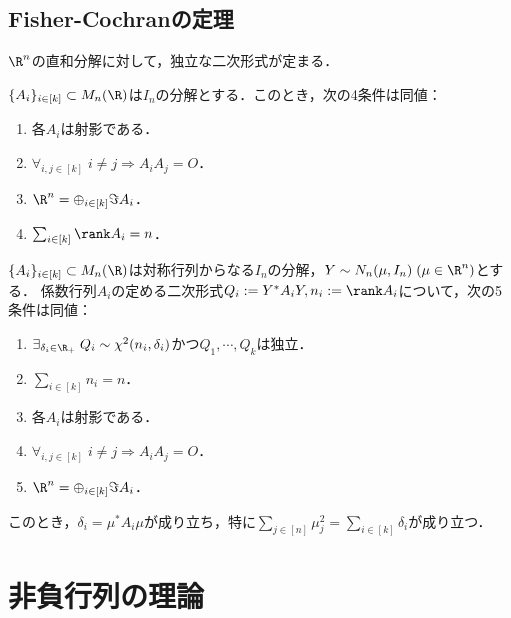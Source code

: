 \documentclass[uplatex, dvipdfmx]{jsreport}
\begin{document}
\subsection{Fisher-Cochranの定理}

\begin{tcolorbox}[colframe=ForestGreen, colback=ForestGreen!10!white,breakable,colbacktitle=ForestGreen!40!white,coltitle=black,fonttitle=\bfseries\sffamily,
title=]
    $\R^n$の直和分解に対して，独立な二次形式が定まる．
\end{tcolorbox}

\begin{theorem}
    $\{A_i\}_{i\in[k]}\subset M_n(\R)$は$I_n$の分解とする．このとき，次の4条件は同値：
    \begin{enumerate}
        \item 各$A_i$は射影である．
        \item $\forall_{i,j\in[k]}\;i\ne j\Rightarrow A_iA_j=O$．
        \item $\R^n=\oplus_{i\in[k]}\Im A_i$．
        \item $\sum_{i\in[k]}\rank A_i=n$．
    \end{enumerate}
\end{theorem}

\begin{theorem}
    $\{A_i\}_{i\in[k]}\subset M_n(\R)$は対称行列からなる$I_n$の分解，$Y\sim N_n(\mu,I_n)\;(\mu\in\R^n)$とする．
    係数行列$A_i$の定める二次形式$Q_i:=Y^*A_iY,n_i:=\rank A_i$について，次の5条件は同値：
    \begin{enumerate}
        \item $\exists_{\delta_i\in\R_+}\;Q_i\sim\chi^2(n_i,\delta_i)$かつ$Q_1,\cdots,Q_k$は独立．
        \item $\sum_{i\in[k]}n_i=n$．
        \item 各$A_i$は射影である．
        \item $\forall_{i,j\in[k]}\;i\ne j\Rightarrow A_iA_j=O$．
        \item $\R^n=\oplus_{i\in[k]}\Im A_i$．
    \end{enumerate}
    このとき，$\delta_i=\mu^*A_i\mu$が成り立ち，特に$\sum_{j\in[n]}\mu_j^2=\sum_{i\in[k]}\delta_i$が成り立つ．
\end{theorem}

\section{非負行列の理論}
\end{document}
